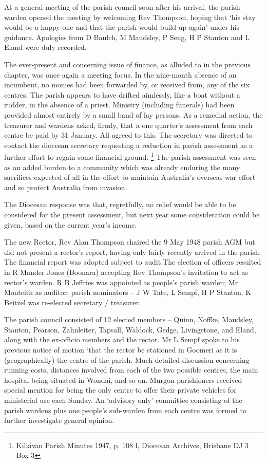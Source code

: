 At a general meeting of the parish council soon after his arrival, the parish warden opened the meeting by welcoming Rev Thompson, hoping that `his stay would be a happy one and that the parish would build up again' under his guidance. Apologies from D Baulch, M Maudsley, P Seng, H P Stanton and L Eland were duly recorded.

The ever-present and concerning issue of finance, as alluded to in the previous chapter, was once again a meeting focus. In the nine-month absence of an incumbent, no monies had been forwarded by, or received from, any of the six centres. The parish appears to have drifted aimlessly, like a boat without a rudder, in the absence of a priest. Ministry (including funerals) had been provided almost entirely by a small band of lay persons. As a remedial action, the treasurer and wardens asked, firmly, that a one quarter's assessment from each centre be paid by 31 January. All agreed to this. The secretary was directed to contact the diocesan secretary requesting a reduction in parish assessment as a further effort to regain some financial ground. \footnote{Kilkivan Parish Minutes 1947, p. 108 l, Diocesan Archives, Brisbane DJ 3 Box 3} The parish assessment was seen as an added burden to a community which was already enduring the many sacrifices expected of all in the effort to maintain Australia's overseas war effort and so protect Australia from invasion.

The Diocesan response was that, regretfully, no relief would be able to be considered for the present assessment, but next year some consideration could be given, based on the current year's income.

The new Rector, Rev Alan Thompson chaired the 9 May 1948 parish AGM but did not present a rector's report, having only fairly recently arrived in the parish. The financial report was adopted subject to audit.The election of officers resulted in R Mander Jones (Boonara) accepting Rev Thompson's invitation to act as rector's warden. R B Jeffries was appointed as people's parish warden; Mr Monteith as auditor; parish nominators -- J W Tate, L Sempf, H P Stanton. K Beitzel was re-elected secretary / treasurer.

The parish council consisted of 12 elected members -- Quinn, Noffke, Maudsley, Stanton, Pearson, Zahnleiter, Tapsall, Waldock, Gedge, Livingstone, and Eland, along with the ex-officio members and the rector. Mr L Sempf spoke to his previous notice of motion `that the rector be stationed in Goomeri as it is (geographically) the centre of the parish. Much detailed discussion concerning running costs, distances involved from each of the two possible centres, the main hospital being situated in Wondai, and so on. Murgon parishioners received special mention for being the only centre to offer their private vehicles for ministerial use each Sunday. An `advisory only' committee consisting of the parish wardens plus one people's sub-warden from each centre was formed to further investigate general opinion.

